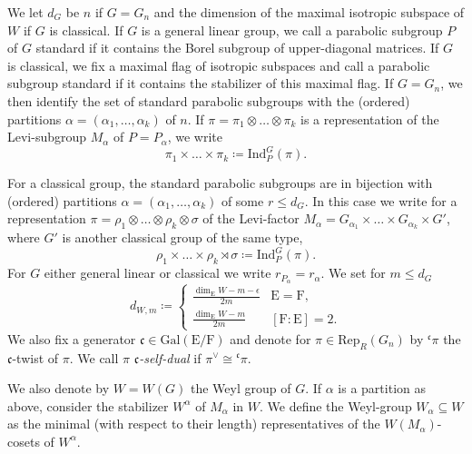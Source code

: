 \documentclass[10pt,a4paper]{article}
\theoremstyle{remark}
\theoremstyle{definition}
\newcommand{\rep}{\mathrm{Rep}}
\newcommand{\ip}{\mathrm{Ind}_P^G}
\newcommand{\FF}{\mathrm{F}}
\newcommand{\EE}{\mathrm{E}}
\newcommand{\fc}{\mathfrak{c}}
\begin{document}
We let $d_G$ be $n$ if $G=G_n$ and the dimension of the maximal isotropic subspace of $W$ if $G$ is classical. If $G$ is a general linear group, we call a parabolic subgroup $P$ of $G$ standard if it contains the Borel subgroup of upper-diagonal matrices. If $G$ is classical, we fix a maximal flag of isotropic subspaces and call a parabolic subgroup standard if it contains the stabilizer of this maximal flag.
If $G=G_n$, we then identify the set of standard parabolic subgroups with the (ordered) partitions $
\alpha=(\alpha_1,\ldots,\alpha_k)$ of $n$. If $\pi=\pi_1\otimes\ldots\otimes\pi_k$ is a representation of the Levi-subgroup $M_\alpha$ of $P=P_\alpha$, we write 
\[\pi_1\times\ldots\times\pi_k\coloneqq\ip(\pi).\]

For a classical group, the standard parabolic subgroups are in bijection with (ordered) partitions $\alpha=(\alpha_1,\ldots,\alpha_k)$ of some $r\le d_G$. In this case we write for a representation $\pi=\rho_1\otimes\ldots\otimes\rho_k\otimes \sigma$ of the Levi-factor $M_\alpha=G_{\alpha_1}\times\ldots\times G_{\alpha_k}\times G'$, where $G'$ is another classical group of the same type,
\[\rho_1\times\ldots\times\rho_k\rtimes\sigma\coloneqq\ip(\pi).\]
For $G$ either general linear or classical we write $r_{P_\alpha}=r_\alpha$. We set for $m\le d_G$
\[d_{W,m}\coloneqq \begin{cases}
    \frac{\dim_{\EE} W-m-\epsilon}{2m}&\EE=\FF,\\
    \frac{\dim_{\EE} W-m}{2m}&[\FF:\EE]=2.\end{cases}\]
We also fix a generator $\fc\in\mathrm{Gal}(\EE/\FF)$ and denote for $\pi\in\rep_R(G_n)$ by ${}^\fc\pi$ the $\fc$-twist of $\pi$. We call $\pi$ \emph{$\fc$-self-dual} if $\pi^\lor\cong{}^\fc\pi$.
    
We also denote by $W=W(G)$ the Weyl group of $G$. If $\alpha$ is a partition as above, consider the stabilizer $W^\alpha$ of $M_\alpha$ in $W$. We define the Weyl-group $W_\alpha\subseteq W$ as the minimal (with respect to their length) representatives of the $W(M_\alpha)$-cosets of $W^\alpha$.
\end{document}
